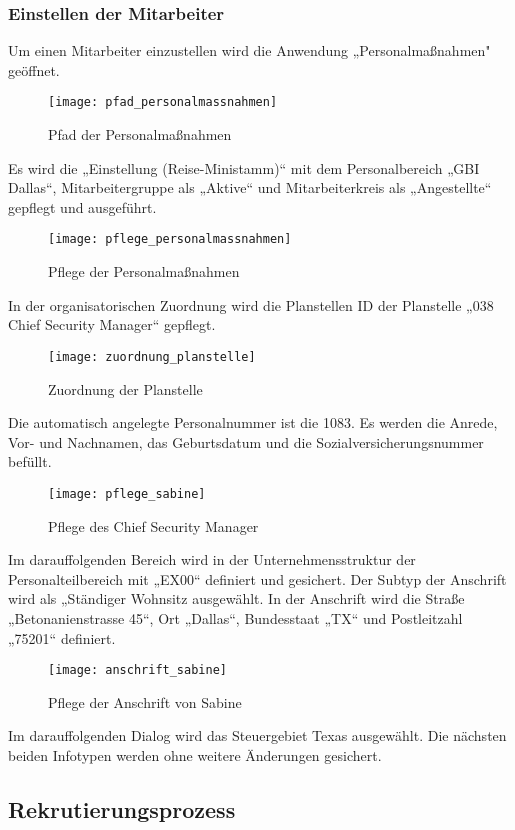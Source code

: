 \subsubsection{Einstellen der Mitarbeiter}
Um einen Mitarbeiter einzustellen wird die Anwendung „Personalmaßnahmen" geöffnet.
\begin{figure}[H]
	\centering
	\texttt{[image: pfad\_personalmassnahmen]}
	\caption{Pfad der Personalmaßnahmen}
	\label{fig:pfad_personalmassnahmen}
\end{figure}
Es wird die „Einstellung (Reise-Ministamm)“ mit dem Personalbereich „GBI Dallas“, Mitarbeitergruppe als „Aktive“ und Mitarbeiterkreis als „Angestellte“ gepflegt und ausgeführt.
\begin{figure}[H]
	\centering
	\texttt{[image: pflege\_personalmassnahmen]}
	\caption{Pflege der Personalmaßnahmen}
	\label{fig:pflege_personalmassnahmen}
\end{figure}
In der organisatorischen Zuordnung wird die Planstellen ID der Planstelle „038 Chief Security Manager“ gepflegt.
\begin{figure}[H]
	\centering
	\texttt{[image: zuordnung\_planstelle]}
	\caption{Zuordnung der Planstelle}
	\label{fig:zuordnung_planstelle}
\end{figure}
Die automatisch angelegte Personalnummer ist die 1083. Es werden die Anrede, Vor- und Nachnamen, das Geburtsdatum und die Sozialversicherungsnummer befüllt.
\begin{figure}[H]
	\centering
	\texttt{[image: pflege\_sabine]}
	\caption{Pflege des Chief Security Manager}
	\label{fig:pflege_sabine}
\end{figure}
Im darauffolgenden Bereich wird in der Unternehmensstruktur der Personalteilbereich mit „EX00“ definiert und gesichert. Der Subtyp der Anschrift wird als „Ständiger Wohnsitz ausgewählt. In der Anschrift wird die Straße „Betonanienstrasse 45“, Ort „Dallas“, Bundesstaat „TX“ und Postleitzahl „75201“ definiert.
\begin{figure}[H]
	\centering
	\texttt{[image: anschrift\_sabine]}
	\caption{Pflege der Anschrift von Sabine}
	\label{fig:anschrift_sabine}
\end{figure}
Im darauffolgenden Dialog wird das Steuergebiet Texas ausgewählt. Die nächsten beiden Infotypen werden ohne weitere Änderungen gesichert.

\subsection{Rekrutierungsprozess}

